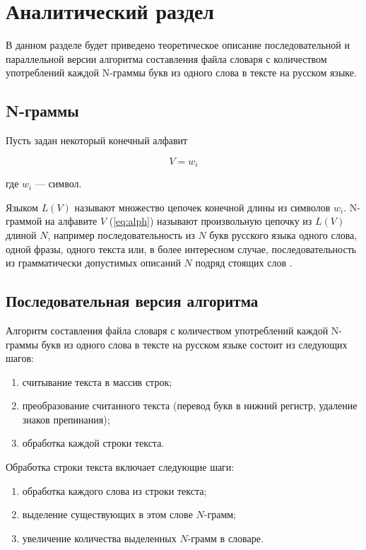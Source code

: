 \chapter{Аналитический раздел}

В данном разделе будет приведено теоретическое описание последовательной и параллельной версии алгоритма составления файла словаря с количеством употреблений каждой N-граммы букв из одного слова в тексте на русском языке.

\section{N-граммы}

Пусть задан некоторый конечный алфавит 

\begin{equation}
	\label{eq:alph}
	V = {w_i}
\end{equation} 

где $w_i$ --- символ. 

Языком $L(V)$ называют множество цепочек конечной длины из символов $w_i$.
N-граммой на алфавите $V$ (\ref{eq:alph}) называют произвольную цепочку из $L(V)$ длиной $N$, например последовательность из $N$ букв русского языка одного слова, одной фразы, одного текста или, в более интересном случае, последовательность из грамматически допустимых описаний $N$ подряд стоящих слов \cite{info_ngram}.

\section{Последовательная версия алгоритма}

Алгоритм составления файла словаря с количеством употреблений каждой N-граммы букв из одного слова в тексте на русском языке состоит из следующих шагов:

\begin{enumerate}[label={\arabic*)}]
	\item считывание текста в массив строк;
	\item преобразование считанного текста (перевод букв в нижний регистр, удаление знаков препинания);
	\item обработка каждой строки текста.
\end{enumerate}

Обработка строки текста включает следующие шаги:

\begin{enumerate}[label={\arabic*)}]
	\item обработка каждого слова из строки текста;
	\item выделение существующих в этом слове $N$-грамм;
	\item увеличение количества выделенных $N$-грамм в словаре.
\end{enumerate}

